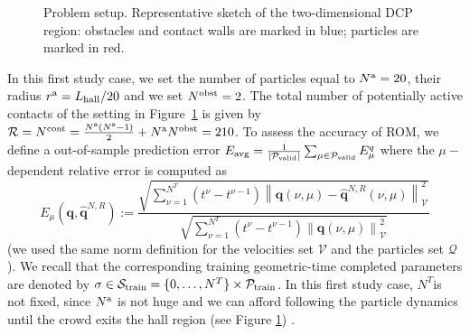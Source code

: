 \begin{figure}[h!]
\caption{Problem setup. Representative sketch of the two-dimensional DCP region: obstacles and contact walls are marked in blue; particles are marked in red.}
\label{fig:region}
\end{figure}
In this first study case, we set the number of particles equal to $N^{\rm a}=20$, their radius $r^{\rm a}=L_{\rm hall}/20$ and we set  $N^{\rm obst}=2$. The total number of potentially active contacts of the setting in Figure~\ref{fig:region} is given by $\mathcal R =N^{\rm cont}=\frac{N^{\rm a} (N^{\rm a}-1)}{2}+N^{\rm a}N^{\rm obst}=210$.
To assess the accuracy of ROM, we define a out-of-sample prediction error
$E_{\rm avg}=\frac{1}{|\mathcal P_{\rm valid}|} \sum_{\mu \in \mathcal P_{\rm valid}} E^q_{\mu}$
where the $\mu-$dependent relative error is computed as
$$E_{\mu}(\mathbf{q}, \hat{\mathbf{q}}^{N,R}):=\frac{\sqrt{\sum_{\nu=1}^{N^T} (t^{\nu}-t^{\nu-1})\left\|\mathbf{q}(\nu,\mu)-\hat{\mathbf{q}}^{N,R}(\nu,\mu)\right\|_{\mathcal V}^2}
}{\sqrt{\sum_{\nu=1}^{N^T} (t^{\nu}-t^{\nu-1})\left\|\mathbf{q}(\nu,\mu)\right\|_{\mathcal V}^2}}$$
(we used the same norm definition for the velocities set $\mathcal{V}$ and the particles set $\mathcal{Q}$). 
We recall that the corresponding training geometric-time completed parameters are denoted by $\sigma \in \mathcal{S}_{\rm{train}}=\{0, \ldots, N^{T}\} \times \mathcal{P}_{\rm{train}}$. In this first study case, $N^T$is not fixed, since $N^{\rm{a}}$ is not huge and we can afford following the particle dynamics until the crowd exits the hall region (see Figure \ref{fig:region}) . %
